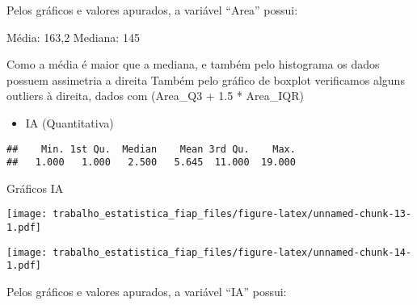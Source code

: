 \documentclass[
]{article}
\newenvironment{Shaded}{\begin{snugshade}}{\end{snugshade}}
\newcommand{\AttributeTok}[1]{\textcolor[rgb]{0.77,0.63,0.00}{#1}}
\newcommand{\DecValTok}[1]{\textcolor[rgb]{0.00,0.00,0.81}{#1}}
\newcommand{\FunctionTok}[1]{\textcolor[rgb]{0.00,0.00,0.00}{#1}}
\newcommand{\NormalTok}[1]{#1}
\newcommand{\SpecialCharTok}[1]{\textcolor[rgb]{0.00,0.00,0.00}{#1}}
\providecommand{\tightlist}{%
  \setlength{\itemsep}{0pt}\setlength{\parskip}{0pt}}
\begin{document}
Pelos gráficos e valores apurados, a variável ``Area'' possui:

Média: 163,2 Mediana: 145

Como a média é maior que a mediana, e também pelo histograma os dados
possuem assimetria a direita Também pelo gráfico de boxplot verificamos
alguns outliers à direita, dados com (Area\_Q3 + 1.5 * Area\_IQR)

\begin{itemize}
\tightlist
\item
  IA (Quantitativa)
\end{itemize}

\begin{Shaded}
\end{Shaded}

\begin{verbatim}
##    Min. 1st Qu.  Median    Mean 3rd Qu.    Max. 
##   1.000   1.000   2.500   5.645  11.000  19.000
\end{verbatim}

Gráficos IA

\begin{Shaded}
\end{Shaded}

\texttt{[image: trabalho\_estatistica\_fiap\_files/figure-latex/unnamed-chunk-13-1.pdf]}

\begin{Shaded}
\end{Shaded}

\texttt{[image: trabalho\_estatistica\_fiap\_files/figure-latex/unnamed-chunk-14-1.pdf]}

Pelos gráficos e valores apurados, a variável ``IA'' possui:
\end{document}
